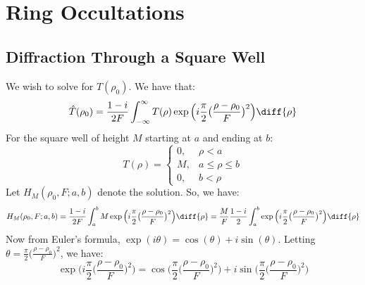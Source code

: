 \documentclass[crop=false,class=article,oneside]{standalone}
\begin{document}
    \ifx\ifresearchnotesosthemathematicsofcassini\undefined
        \section*{Ring Occultations}
        \setcounter{section}{1}
        \renewcommand\thesubfigure{%
            \arabic{section}.\arabic{figure}.\arabic{subfigure}%
        }
    \fi
    \subsection{Diffraction Through a Square Well}
        \label{Subsec:Cassini_Math_Diffraction_%
               Through_a_Square_well}
        We wish to solve for $\hat{T}(\rho_{0})$. We have that:
        \begin{equation*}
            \hat{T}(\rho_{0})
            =\frac{1-i}{2F}
                \int_{-\infty}^{\infty}T(\rho)
                \exp\Big(i\frac{\pi}{2}
                    \big(\frac{\rho-\rho_{0}}{F}\big)^{2}\Big)
                \diff{\rho}
        \end{equation*}
        For the square well of height $M$
        starting at $a$ and ending at $b$:
        \begin{equation*}
            T(\rho)=
            \begin{cases}
                0,&\rho<a\\
                M,&a\leq\rho\leq{b}\\
                0,&b<\rho
            \end{cases}
        \end{equation*}
        Let $H_{M}(\rho_0,F;a,b)$ denote the solution.
        So, we have:
        \begin{equation*}
            H_{M}(\rho_0,F;a,b)
            =\frac{1-i}{2F}
                \int_{a}^{b}M
                \exp\Big(i\frac{\pi}{2}
                    \big(\frac{\rho-\rho_{0}}{F}\big)^{2}\Big)
                \diff{\rho}
            =\frac{M}{F}\frac{1-i}{2}
                \int_{a}^{b}
                \exp\Big(i\frac{\pi}{2}
                    \big(\frac{\rho-\rho_{0}}{F}\big)^{2}\Big)
                \diff{\rho}
        \end{equation*}
        Now from Euler's formula,
        $\exp(i\theta)=\cos(\theta)+i\sin(\theta).$ Letting
        $\theta=\frac{\pi}{2}\big(\frac{\rho-\rho_0}{F}\big)^2$,
        we have:
        \begin{equation*}
            \exp\Big(
                i\frac{\pi}{2}\big(\frac{\rho-\rho_{0}}{F}\big)^{2}
                \Big)
            =\cos\Big(
                \frac{\pi}{2}\big(\frac{\rho-\rho_{0}}{F}\big)^{2}
            \Big)+
            i\sin\Big(
                \frac{\pi}{2}\big(\frac{\rho-\rho_{0}}{F}\big)^{2}
            \Big)
        \end{equation*}
\end{document}

